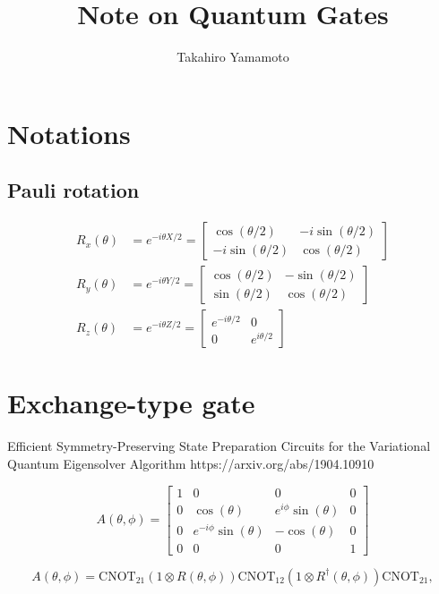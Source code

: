 \documentclass[11pt, oneside]{article}   	%
\title{Note on Quantum Gates}
\author{Takahiro Yamamoto}
\begin{document}
\maketitle
\section{Notations}
\subsection{Pauli rotation}
\begin{align}
R_x(\theta) &= e^{-i \theta X/2} = 
\begin{bmatrix}
\cos(\theta/2) & -i \sin(\theta/2) \\
-i \sin(\theta/2) & \cos(\theta/2)
\end{bmatrix} \\
R_y(\theta) &= e^{-i \theta Y/2} = 
\begin{bmatrix}
\cos(\theta/2) & -\sin(\theta/2) \\
\sin(\theta/2) & \cos(\theta/2)
\end{bmatrix} \\
R_z(\theta) &= e^{-i \theta Z/2} = 
\begin{bmatrix}
e^{-i \theta/2} & 0 \\
0 & e^{i \theta/2}
\end{bmatrix}
\end{align}

\section{Exchange-type gate}
Efficient Symmetry-Preserving State Preparation Circuits for the Variational Quantum Eigensolver Algorithm
https://arxiv.org/abs/1904.10910

\begin{equation}
A(\theta, \phi) = 
\begin{bmatrix}
1 & 0 & 0 & 0 \\
0 & \cos(\theta) & e^{i \phi} \sin(\theta) & 0 \\
0 & e^{-i \phi} \sin(\theta) & -\cos(\theta) & 0 \\
0 & 0 & 0 & 1
\end{bmatrix}
\end{equation}

\begin{equation}
A(\theta, \phi) = \mathrm{CNOT}_{21} \left(1 \otimes R(\theta, \phi) \right) \mathrm{CNOT}_{12} \left(1 \otimes R^{\dagger}(\theta, \phi) \right) \mathrm{CNOT}_{21},
\end{equation}
\end{document}
